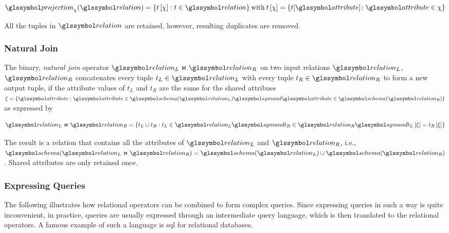 \begin{equation}
    \label{equation:rel_op_projection}
    \projection_{\chi}(\relation) = \{ t\left[ \chi \right] : t \in \relation \} \: \textrm{with} \: t\left[ \chi \right] = \{ t[\attribute] \colon \attribute \in \chi \}
\end{equation}

All the tuples in $\relation$ are retained, however, resulting duplicates are removed.

\subsubsection{Natural Join}

The binary, \emph{natural join} operator $\relation_L \Join \relation_R$ on two input relations $\relation_L$, $\relation_R$ concatenates every tuple $t_{L} \in \relation_L$ with every tuple $t_{R} \in \relation_R$ to form a new output tuple, if the attribute values of $t_{L}$ and $t_{R}$ are the same for the shared attribues $\xi = \{ \attribute : \attribute \in \schema(\relation_L) \symand \attribute \in \schema(\relation_R) \}$ as expressed by 

\begin{equation}
    \label{equation:rel_op_join}
    \relation_L \Join \relation_R = \{ t_L \cup t_R : t_L \in \relation_L \symand t_R \in \relation_R \symand t_L\left[ \xi \right] = t_R\left[ \xi \right] \}
\end{equation}

The result is a relation that contains all the attributes of $\relation_L$ and $\relation_R$, i.e., $\schema(\relation_L \Join \relation_R) = \schema(\relation_L) \cup \schema(\relation_R)$. Shared attributes are only retained once.

\subsubsection{Expressing Queries}

The following  illustrates how relational operators can be combined to form complex queries. Since expressing queries in such a way is quite inconvenient, in practice, queries are usually expressed through an intermediate query language, which is then translated to the relational operators. A famous example of such a language is \acrshort{sql} \cite{Chamberlin:2012Early} for relational databases.

